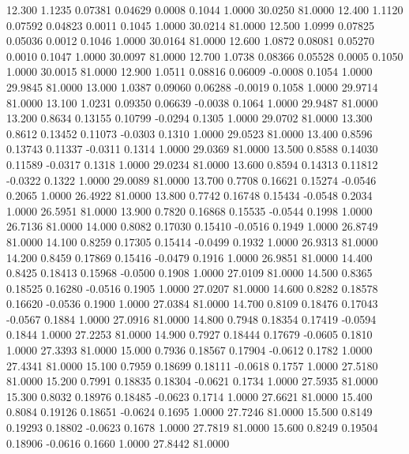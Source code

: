   12.300   1.1235   0.07381   0.04629   0.0008   0.1044   1.0000  30.0250  81.0000
  12.400   1.1120   0.07592   0.04823   0.0011   0.1045   1.0000  30.0214  81.0000
  12.500   1.0999   0.07825   0.05036   0.0012   0.1046   1.0000  30.0164  81.0000
  12.600   1.0872   0.08081   0.05270   0.0010   0.1047   1.0000  30.0097  81.0000
  12.700   1.0738   0.08366   0.05528   0.0005   0.1050   1.0000  30.0015  81.0000
  12.900   1.0511   0.08816   0.06009  -0.0008   0.1054   1.0000  29.9845  81.0000
  13.000   1.0387   0.09060   0.06288  -0.0019   0.1058   1.0000  29.9714  81.0000
  13.100   1.0231   0.09350   0.06639  -0.0038   0.1064   1.0000  29.9487  81.0000
  13.200   0.8634   0.13155   0.10799  -0.0294   0.1305   1.0000  29.0702  81.0000
  13.300   0.8612   0.13452   0.11073  -0.0303   0.1310   1.0000  29.0523  81.0000
  13.400   0.8596   0.13743   0.11337  -0.0311   0.1314   1.0000  29.0369  81.0000
  13.500   0.8588   0.14030   0.11589  -0.0317   0.1318   1.0000  29.0234  81.0000
  13.600   0.8594   0.14313   0.11812  -0.0322   0.1322   1.0000  29.0089  81.0000
  13.700   0.7708   0.16621   0.15274  -0.0546   0.2065   1.0000  26.4922  81.0000
  13.800   0.7742   0.16748   0.15434  -0.0548   0.2034   1.0000  26.5951  81.0000
  13.900   0.7820   0.16868   0.15535  -0.0544   0.1998   1.0000  26.7136  81.0000
  14.000   0.8082   0.17030   0.15410  -0.0516   0.1949   1.0000  26.8749  81.0000
  14.100   0.8259   0.17305   0.15414  -0.0499   0.1932   1.0000  26.9313  81.0000
  14.200   0.8459   0.17869   0.15416  -0.0479   0.1916   1.0000  26.9851  81.0000
  14.400   0.8425   0.18413   0.15968  -0.0500   0.1908   1.0000  27.0109  81.0000
  14.500   0.8365   0.18525   0.16280  -0.0516   0.1905   1.0000  27.0207  81.0000
  14.600   0.8282   0.18578   0.16620  -0.0536   0.1900   1.0000  27.0384  81.0000
  14.700   0.8109   0.18476   0.17043  -0.0567   0.1884   1.0000  27.0916  81.0000
  14.800   0.7948   0.18354   0.17419  -0.0594   0.1844   1.0000  27.2253  81.0000
  14.900   0.7927   0.18444   0.17679  -0.0605   0.1810   1.0000  27.3393  81.0000
  15.000   0.7936   0.18567   0.17904  -0.0612   0.1782   1.0000  27.4341  81.0000
  15.100   0.7959   0.18699   0.18111  -0.0618   0.1757   1.0000  27.5180  81.0000
  15.200   0.7991   0.18835   0.18304  -0.0621   0.1734   1.0000  27.5935  81.0000
  15.300   0.8032   0.18976   0.18485  -0.0623   0.1714   1.0000  27.6621  81.0000
  15.400   0.8084   0.19126   0.18651  -0.0624   0.1695   1.0000  27.7246  81.0000
  15.500   0.8149   0.19293   0.18802  -0.0623   0.1678   1.0000  27.7819  81.0000
  15.600   0.8249   0.19504   0.18906  -0.0616   0.1660   1.0000  27.8442  81.0000
